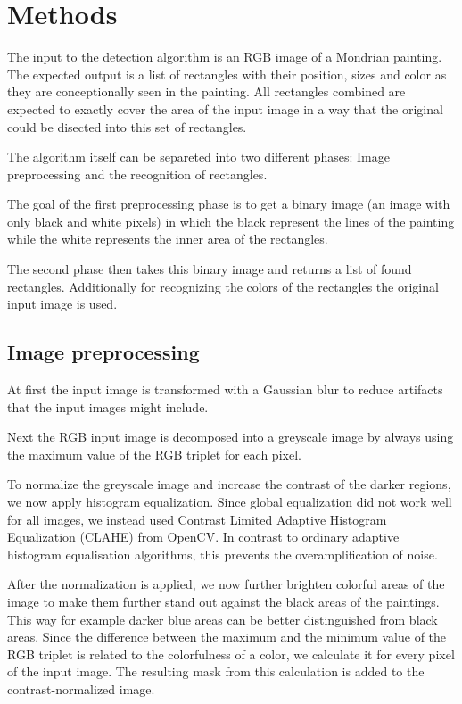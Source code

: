 

\section{Methods}

The input to the detection algorithm is an RGB image of a Mondrian painting. The
expected output is a list of rectangles with their position, sizes and color as
they are conceptionally seen in the painting. All rectangles combined are
expected to exactly cover the area of the input image in a way that the original
could be disected into this set of rectangles.

The algorithm itself can be separeted into two different phases: Image
preprocessing and the recognition of rectangles.

The goal of the first preprocessing phase is to get a binary image (an image
with only black and white pixels) in which the black represent the lines of the
painting while the white represents the inner area of the rectangles.

The second phase then takes this binary image and returns a list of found
rectangles. Additionally for recognizing the colors of the rectangles the
original input image is used.

\subsection{Image preprocessing}

At first the input image is transformed with a Gaussian blur to reduce artifacts
that the input images might include.

Next the RGB input image is decomposed into a greyscale image by always using
the maximum value of the RGB triplet for each pixel.

To normalize the greyscale image and increase the contrast of the darker
regions, we now apply histogram equalization. Since global equalization did not
work well for all images, we instead used Contrast Limited Adaptive Histogram
Equalization (CLAHE) from OpenCV. In contrast to ordinary adaptive histogram
equalisation algorithms, this prevents the overamplification of noise.

After the normalization is applied, we now further brighten colorful areas of the
image to make them further stand out against the black areas of the paintings.
This way for example darker blue areas can be better distinguished from black areas.
Since the difference between the maximum and the minimum value of the RGB triplet
is related to the colorfulness of a color, we calculate it for every pixel of the
input image. The resulting mask from this calculation is added to the
contrast-normalized image.

